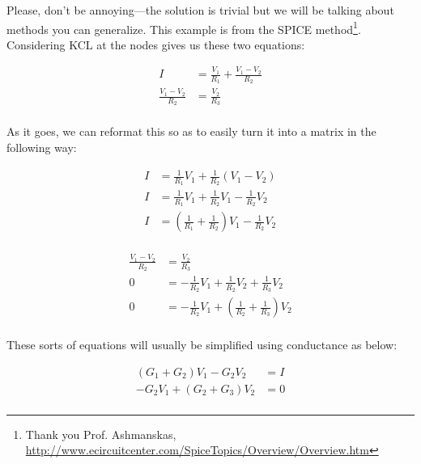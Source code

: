 \documentclass[12pt]{report}
\newcommand{\pr}[1]{\left(#1\right)}
\begin{document}
Please, don't be annoying---the solution is trivial but we will be talking about methods you can generalize. This example is from the SPICE method\footnote{Thank you Prof. Ashmanskas, \url{http://www.ecircuitcenter.com/SpiceTopics/Overview/Overview.htm}}. Considering KCL at the nodes gives us these two equations:

\begin{equation} \label{lattice1}
\begin{split}
I &= \frac{V_1}{R_1} + \frac{V_1 - V_2}{R_2}\\
\frac{V_1 - V_2}{R_2} &= \frac{V_2}{R_3} \\
\end{split}
\end{equation}

As it goes, we can reformat this so as to easily turn it into a matrix in the following way: 

\begin{equation} \label{lattice2}
\begin{split}
I &= \frac{1}{R_1}V_1 + \frac{1}{R_2}\pr{V_1 - V_2}\\
I &= \frac{1}{R_1}V_1 + \frac{1}{R_2}V_1 - \frac{1}{R_2}V_2\\
I &= \pr{\frac{1}{R_1} + \frac{1}{R_2}}V_1 - \frac{1}{R_2}V_2\\
\end{split}
\end{equation}

\begin{equation} \label{lattice3}
\begin{split}
\frac{V_1 - V_2}{R_2} &= \frac{V_2}{R_3} \\
0 &= - \frac{1}{R_2}V_1 + \frac{1}{R_2}V_2 + \frac{1}{R_3}V_2 \\
0 &= - \frac{1}{R_2}V_1 + \pr{\frac{1}{R_2} + \frac{1}{R_3}}V_2 \\
\end{split}
\end{equation}

These sorts of equations will usually be simplified using conductance as below: 

\begin{equation} \label{lattice4}
\begin{split}
\pr{G_1 + G_2}V_1 - G_2V_2 &= I\\
- G_2V_1 + \pr{G_2 + G_3}V_2 &= 0 \\
\end{split}
\end{equation}
\end{document}
